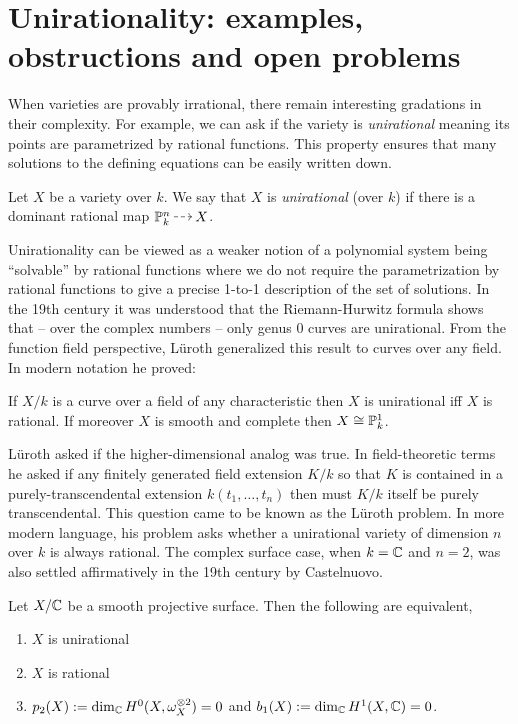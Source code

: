 \documentclass[main.tex]{subfiles}
\begin{document}
\section{Unirationality: examples, obstructions and open problems}


When varieties are provably irrational, there remain interesting gradations in their complexity. For example, we can ask if the variety is \textit{unirational} meaning its points are parametrized by rational functions. This property ensures that many solutions to the defining equations can be easily written down.  

\begin{defn}
Let $X$ be a variety over $k$. We say that $X$ is \textit{unirational} (over $k$) if there is a dominant rational map $\P^n_k \rat X$.
\end{defn}

Unirationality can be viewed as a weaker notion of a polynomial system being ``solvable'' by rational functions where we do not require the parametrization by rational functions to give a precise 1-to-1 description of the set of solutions. In the 19th century it was understood that the Riemann-Hurwitz formula shows that -- over the complex numbers -- only genus $0$ curves are unirational. From the function field perspective, L\"{u}roth generalized this result to curves over any field. In modern notation he proved:

\begin{theorem}[L\"{u}roth, 1876]
If $X/k$ is a curve over a field of any characteristic then $X$ is unirational iff $X$ is rational. If moreover $X$ is smooth and complete then $X \cong \P^1_k$.
\end{theorem}

L\"{u}roth asked if the higher-dimensional analog was true. In field-theoretic terms he asked if any finitely generated field extension $K / k$ so that $K$ is contained in a purely-transcendental extension $k(t_1, \dots, t_n)$ then must $K / k$ itself be purely transcendental. This question came to be known as the L\"{u}roth problem. In more modern language, his problem asks whether a unirational variety of dimension $n$ over $k$ is always rational. The complex surface case, when $k = \CC$ and $n = 2$, was also settled affirmatively in the 19th century by Castelnuovo.

\begin{theorem}[Castelnuovo, 1896]
Let $X / \CC$ be a smooth projective surface. Then the following are equivalent,
\begin{enumerate}
\item $X$ is unirational
\item $X$ is rational
\item $p_2(X) := \dim_{\CC} H^0(X, \omega_X^{\ot 2}) = 0$ and $b_1(X) := \dim_{\CC} H^1(X, \CC) = 0$.
\end{enumerate}
\end{theorem}
\end{document}
